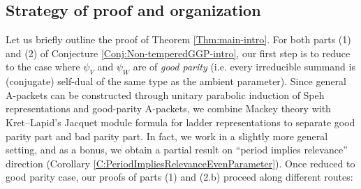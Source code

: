 \documentclass[11pt,letterpaper]{amsart}
\theoremstyle{plain}
\numberwithin{theorem}{section}
\numberwithin{equation}{subsection}
\theoremstyle{remark}
\begin{document}
\subsection{Strategy of proof and organization}

Let us briefly outline the proof of Theorem \ref{Thm:main-intro}. For both parts (1) and (2) of Conjecture \ref{Conj:Non-temperedGGP-intro}, our first step is to reduce to the case where $\psi_V$ and $\psi_W$ are of \emph{good parity} (i.e. every irreducible summand is (conjugate) self-dual of the same type as the ambient parameter). Since general A-packets can be constructed through unitary parabolic induction of Speh representations and good-parity A-packets, we combine Mackey theory with Kret--Lapid's Jacquet module formula for ladder representations \cite{MR2996769} to separate good parity part and bad parity part. In fact, we work in a slightly more general setting, and as a bonus, we obtain a partial result on ``period implies relevance'' direction (Corollary \ref{C:PeriodImpliesRelevanceEvenParameter}). Once reduced to good parity case, our proofs of parts (1) and (2.b) proceed along different routes:
\end{document}
